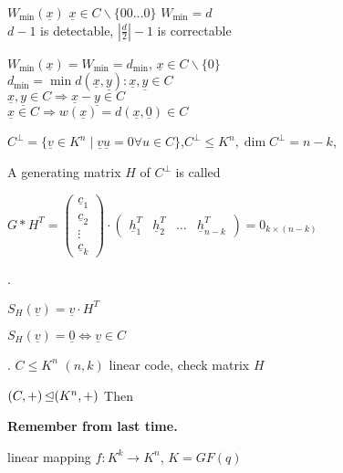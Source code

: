 $W_{\min}(\underline{x})$ $\underline{x} \in C \backslash \{00\ldots 0\}$ $W_{\min} = d$ \\
$d-1$ is detectable, $ \left|\frac{d}{2}\right| -1$ is correctable


$W_{\min}(\underline{x}) = W_{\min} = d_{\min}$, $\underline{x} \in C \backslash \{0\}$ \\
$d_{\min} = \min d( \underline{x},\underline{y}) : \underline{x},\underline{y} \in C$\\
$\underline{x},\underline{y} \in C \Rightarrow \underline{x} - \underline{y} \in C$\\
$\underline{x} \in C \Rightarrow w(\underline{x}) = d(\underline{x},\underline{0}) \in C$\\


\begin{definition}
  $C^\bot = \{ \underline{v} \in K^n \mid \underline{v} \underline{u} = 0 \forall u \in C \}$,$ C^\bot \leq K^n, \dim C^\bot = n-k$,

  A generating matrix $H$ of $C^\bot$ is called 

$G * H^T = \begin{pmatrix}\underline{c}_1\\ \underline{c}_2\\ \vdots \\ \underline{c}_k \end{pmatrix} \cdot \begin{pmatrix}\underline{h}_1^T& \underline{h}_2^T& \ldots & \underline{h}_{n-k}^T \end{pmatrix} = 0_{k\times (n-k)}$
\end{definition}

\Remark.

\begin{definition}
  $S_H(\underline{v}) = \underline{v} \cdot H^T$ 

  $S_H(\underline{v}) = \underline{0} \Leftrightarrow \underline{v} \in C$
\end{definition}

\Theorem.
$C\leq K^n$ $(n,k)$ linear code, check matrix $H$

$(C,+) \operatorname{\trianglelefteq} (K^n, +)$ Then



\textbf{Remember from last time.}

linear mapping $f: K^k \rightarrow K^n$, $K = GF(q)$

